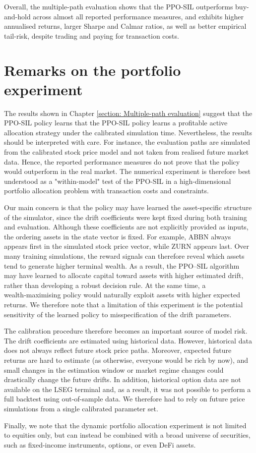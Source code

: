 Overall, the multiple-path evaluation shows that the PPO-SIL outperforms buy-and-hold across almost all reported performance measures, and exhibits higher annualised returns, larger Sharpe and Calmar ratios, as well as better empirical tail-risk, despite trading and paying for transaction costs.

\section{Remarks on the portfolio experiment}
The results shown in Chapter \ref{section: Multiple-path evaluation} suggest that the PPO-SIL policy learns that the PPO-SIL policy learns a profitable active allocation strategy under the calibrated simulation time. Nevertheless, the results should be interpreted with care. For instance, the evaluation paths are simulated from the calibrated stock price model and not taken from realised future market data. Hence, the reported performance measures do not prove that the policy would outperform in the real market. The numerical experiment is therefore best understood as a "within-model" test of the PPO-SIL in a high-dimensional portfolio allocation problem with transaction costs and constraints. 

Our main concern is that the policy may have learned the asset-specific structure of the simulator, since the drift coefficients were kept fixed during both training and evaluation. Although these coefficients are not explicitly provided as inputs, the ordering assets in the state vector is fixed. For example, ABBN always appears first in the simulated stock price vector, while ZURN appears last. Over many training simulations, the reward signals can therefore reveal which assets tend to generate higher terminal wealth. As a result, the PPO–SIL algorithm may have learned to allocate capital toward assets with higher estimated drift, rather than developing a robust decision rule. At the same time, a wealth‑maximising policy would naturally exploit assets with higher expected returns. We therefore note that a limitation of this experiment is the potential sensitivity of the learned policy to misspecification of the drift parameters.

The calibration procedure therefore becomes an important source of model risk. The drift coefficients are estimated using historical data. However, historical data does not always reflect future stock price paths. Moreover, expected future returns are hard to estimate (as otherwise, everyone would be rich by now), and small changes in the estimation window or market regime changes could drastically change the future drifts. In addition, historical option data are not available on the LSEG terminal and, as a result, it was not possible to perform a full backtest using out-of-sample data. We therefore had to rely on future price simulations from a single calibrated parameter set.

Finally, we note that the dynamic portfolio allocation experiment is not limited to equities only, but can instead be combined with a broad universe of securities, such as fixed-income instruments, options, or even DeFi assets.